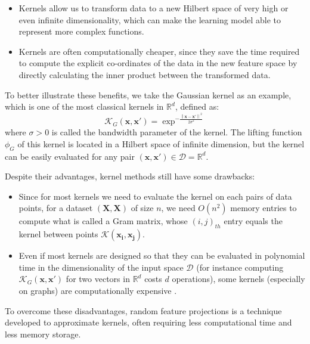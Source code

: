 \begin{itemize}
    \item Kernels allow us to transform data to a new Hilbert space of very high or even infinite dimensionality, which can make the learning model able to represent more complex functions.
    \item Kernels are often computationally cheaper, since they save the time required to compute the explicit co-ordinates of the data in the new feature space by directly calculating the inner product between the transformed data.
\end{itemize}
To better illustrate these benefits, we take the Gaussian kernel as an example, which is one of the most classical kernels in $\mathbb{R}^d$, defined as:
\begin{equation}
\label{eq:Guassian_kernel}
    \mathcal{K}_{G}(\mathbf{x},\mathbf{x}')=\exp^{-\frac{\left \| \mathbf{x}-\mathbf{x}'\right\|^2}{2\sigma^2}}
\end{equation}
where $\sigma>0$ is called the bandwidth parameter of the kernel. The lifting function $\phi_G$ of this kernel is located in a Hilbert space of infinite dimension, but the kernel can be easily evaluated for any pair $(\mathbf{x},\mathbf{x}')\in \mathcal{D}=\mathbb{R}^d$.

Despite their advantages, kernel methods still have some drawbacks:
\begin{itemize}
    \item Since for most kernels we need to evaluate the kernel on each pairs of data points, for a dataset $(\mathbf{X},\mathbf{X})$  of size $n$, we need $O(n^2)$ memory entries to compute what is called a Gram matrix, whose $(i,j)_{th}$ entry equals the kernel between points $\mathcal{K}(\mathbf{x_i}, \mathbf{x_j})$.
    \item Even if most kernels are designed so that they can be evaluated in polynomial time in the dimensionality of the input space $\mathcal{D}$ (for instance computing $\mathcal{K}_{G}(\mathbf{x},\mathbf{x}')$ for two vectors in $\mathbb{R}^d$ costs $d$ operations),  some kernels (especially on graphs) are computationally expensive \citep{graphlet_kernel}. 
\end{itemize}
To overcome these disadvantages, random feature projections is a technique developed to approximate kernels, often requiring less computational time and less memory storage.

